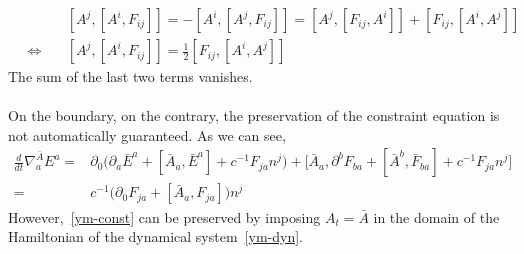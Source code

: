 \begin{equation}
\begin{split}
&[A^j, [A^i, F_{ij}]] = - [A^i, [A^j, F_{ij}]]
= [A^j, [F_{ij}, A^i]] + [F_{ij}, [A^i, A^j]] \\
 \quad\Leftrightarrow\quad &
[A^j, [A^i, F_{ij}]] = \frac 1 2 [F_{ij}, [A^i, A^j]]
\end{split}
\end{equation}
The sum of the last two terms vanishes. \\\\
On the boundary, on the contrary, the preservation of the constraint equation is not automatically guaranteed. As we can see,
\begin{equation*}
\begin{split}
\frac{d}{dt}\nabla^{\bar A}_a E^a = & 
\partial_0\big(\partial_a \bar{E}^a + [\bar{A}_a, \bar{E}^a] + c^{-1} F_{j a} n^j\big) + 
\big[\bar{A}_a, \partial^b F_{ba} + [\bar{A}^b, \bar{F}_{ba}] + c^{-1} F_{j a} n^j\big] \\
%
= & c^{-1}\big(\partial_0 F_{ja}+ [\bar{A}_a, F_{ja}]\big) n^j
\end{split}
\end{equation*}
However,~\cref{ym-const} can be preserved by imposing $A_t = \bar A$ in the domain of the Hamiltonian of the dynamical system~\cref{ym-dyn}.



















